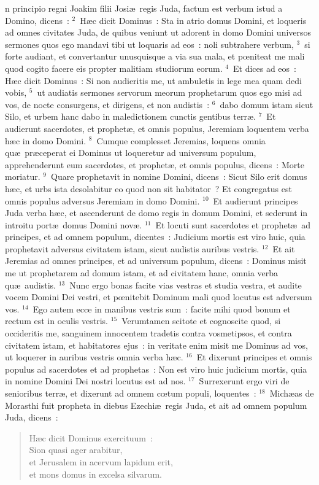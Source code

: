\bchapter
{}n principio regni Joakim filii Josi\ae\ regis Juda, factum est verbum istud a Domino, dicens~:
${}^{2}$~H\ae c dicit Dominus~: Sta in atrio domus Domini, et loqueris ad omnes civitates Juda, de quibus veniunt ut adorent in domo Domini universos sermones quos ego mandavi tibi ut loquaris ad eos~: noli subtrahere verbum,
${}^{3}$~si forte audiant, et convertantur unusquisque a via sua mala, et pœniteat me mali quod cogito facere eis propter malitiam studiorum eorum.
${}^{4}$~Et dices ad eos~: H\ae c dicit Dominus~: Si non audieritis me, ut ambuletis in lege mea quam dedi vobis,
${}^{5}$~ut audiatis sermones servorum meorum prophetarum quos ego misi ad vos, de nocte consurgens, et dirigens, et non audistis~:
${}^{6}$~dabo domum istam sicut Silo, et urbem hanc dabo in maledictionem cunctis gentibus terr\ae .
${}^{7}$~Et audierunt sacerdotes, et prophet\ae , et omnis populus, Jeremiam loquentem verba h\ae c in domo Domini.
${}^{8}$~Cumque complesset Jeremias, loquens omnia qu\ae\ pr\ae ceperat ei Dominus ut loqueretur ad universum populum, apprehenderunt eum sacerdotes, et prophet\ae , et omnis populus, dicens~: Morte moriatur.
${}^{9}$~Quare prophetavit in nomine Domini, dicens~: Sicut Silo erit domus h\ae c, et urbs ista desolabitur eo quod non sit habitator~? Et congregatus est omnis populus adversus Jeremiam in domo Domini.
${}^{10}$~Et audierunt principes Juda verba h\ae c, et ascenderunt de domo regis in domum Domini, et sederunt in introitu port\ae\ domus Domini nov\ae .
${}^{11}$~Et locuti sunt sacerdotes et prophet\ae\ ad principes, et ad omnem populum, dicentes~: Judicium mortis est viro huic, quia prophetavit adversus civitatem istam, sicut audistis auribus vestris.
${}^{12}$~Et ait Jeremias ad omnes principes, et ad universum populum, dicens~: Dominus misit me ut prophetarem ad domum istam, et ad civitatem hanc, omnia verba qu\ae\ audistis.
${}^{13}$~Nunc ergo bonas facite vias vestras et studia vestra, et audite vocem Domini Dei vestri, et pœnitebit Dominum mali quod locutus est adversum vos.
${}^{14}$~Ego autem ecce in manibus vestris sum~: facite mihi quod bonum et rectum est in oculis vestris.
${}^{15}$~Verumtamen scitote et cognoscite quod, si occideritis me, sanguinem innocentem tradetis contra vosmetipsos, et contra civitatem istam, et habitatores ejus~: in veritate enim misit me Dominus ad vos, ut loquerer in auribus vestris omnia verba h\ae c.
${}^{16}$~Et dixerunt principes et omnis populus ad sacerdotes et ad prophetas~: Non est viro huic judicium mortis, quia in nomine Domini Dei nostri locutus est ad nos.
${}^{17}$~Surrexerunt ergo viri de senioribus terr\ae , et dixerunt ad omnem cœtum populi, loquentes~:
${}^{18}$~Mich\ae as de Morasthi fuit propheta in diebus Ezechi\ae\ regis Juda, et ait ad omnem populum Juda, dicens~: \begin{verse}H\ae c dicit Dominus exercituum~:\\ Sion quasi ager arabitur,\\ et Jerusalem in acervum lapidum erit,\\ et mons domus in excelsa silvarum.\end{verse}


